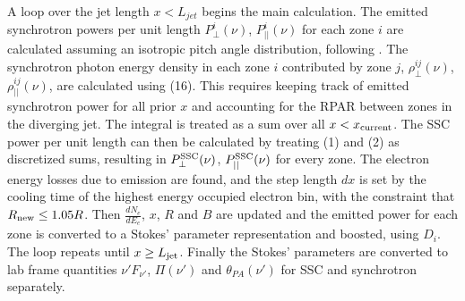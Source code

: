 A loop over the jet length $x < L_{jet}$ begins the main calculation. The emitted synchrotron powers per unit length $P_{\perp}^i(\nu)$, $P_{||}^i(\nu)$ for each zone $i$ are calculated assuming an isotropic pitch angle distribution, following \citet{rybicki_radiative_1979}. The synchrotron photon energy density in each zone $i$ contributed by zone $j$, $\rho_{\perp}^{ij}(\nu)$, $\rho_{||}^{ij}(\nu)$, are calculated using (16). This requires keeping track of emitted synchrotron power for all prior $x$ and accounting for the RPAR between zones in the diverging jet. The integral is treated as a sum over all $x < x_{\rm current}$. The SSC power per unit length can then be calculated by treating (1) and (2) as discretized sums, resulting in $P^{\rm SSC}_{\perp}(\nu)$, $P^{\rm SSC}_{||}(\nu)$ for every zone. The electron energy losses due to emission are found, and the step length $dx$ is set by the cooling time of the highest energy occupied electron bin, with the constraint that $R_{\rm new} \leq 1.05 R$. Then $\frac{dN_e}{dE_e}$, $x$, $R$ and $B$ are updated and the emitted power for each zone is converted to a Stokes' parameter representation and boosted, using $D_i$. The loop repeats until $x \geq L_{\rm jet}$. Finally the Stokes' parameters are converted to lab frame quantities $\nu' F_{\nu'}$, $\Pi(\nu')$ and $\theta_{PA}(\nu')$ for SSC and synchrotron separately.